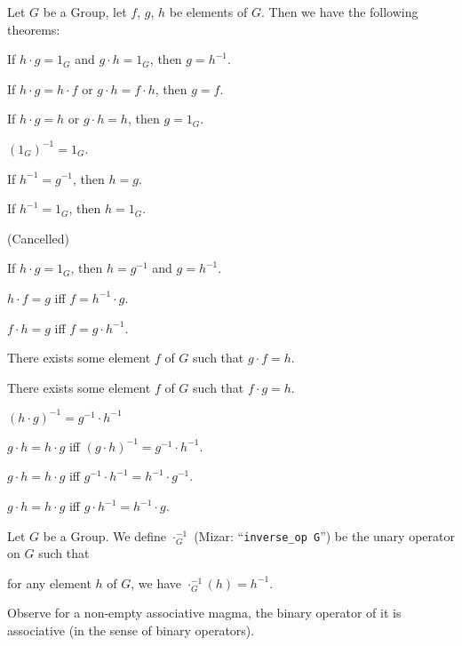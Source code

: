 \documentclass{article}
\begin{document}
Let $G$ be a Group, let $f$, $g$, $h$ be elements of $G$. Then we have
the following theorems:
\begin{thm}
\item\label{group1:5} If $h\cdot g=1_{G}$ and $g\cdot h=1_{G}$, then $g=h^{-1}$.
\item\label{group1:6} If $h\cdot g=h\cdot f$ or $g\cdot h=f\cdot h$,
  then $g=f$.
\item\label{group1:7} If $h\cdot g=h$ or $g\cdot h=h$, then $g=1_{G}$.
\item\label{group1:8} $(1_{G})^{-1}=1_{G}$. 
\item\label{group1:9} If $h^{-1}=g^{-1}$, then $h=g$.
\item\label{group1:10} If $h^{-1}=1_{G}$, then $h=1_{G}$.
\item\label{group1:11} (Cancelled)
\item\label{group1:12} If $h\cdot g=1_{G}$, then $h=g^{-1}$ and $g=h^{-1}$.
\item\label{group1:13} $h\cdot f=g$ iff $f=h^{-1}\cdot g$.
\item\label{group1:14} $f\cdot h=g$ iff $f=g\cdot h^{-1}$.
\item\label{group1:15} There exists some element $f$ of $G$ such that
  $g\cdot f=h$.
\item\label{group1:16} There exists some element $f$ of $G$ such that
  $f\cdot g=h$.
\item\label{group1:17} $(h\cdot g)^{-1}=g^{-1}\cdot h^{-1}$
\item\label{group1:18} $g\cdot h=h\cdot g$ iff $(g\cdot h)^{-1}=g^{-1}\cdot h^{-1}$.
\item\label{group1:19} $g\cdot h=h\cdot g$ iff $g^{-1}\cdot h^{-1}=h^{-1}\cdot g^{-1}$.
\item\label{group1:20} $g\cdot h=h\cdot g$ iff $g\cdot h^{-1}=h^{-1}\cdot g$.
\end{thm}

\begin{definition}
Let $G$ be a Group.
We define $\cdot_{G}^{-1}$ (Mizar: ``\verb#inverse_op G#'') be the unary operator on $G$ such that
\begin{defn}
\item for any element $h$ of $G$, we have $\cdot_{G}^{-1}(h)=h^{-1}$.
\end{defn}
\end{definition}

Observe for a non-empty associative magma, the binary operator of it is
associative (in the sense of binary operators).
\end{document}

